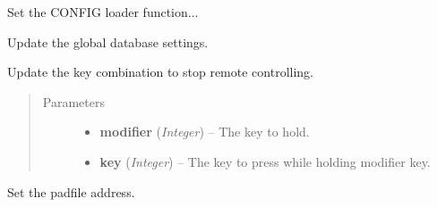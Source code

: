 \documentclass[letterpaper,10pt,english]{sphinxmanual}
\begin{document}

\begin{fulllineitems}
\label{diwavars:diwavars.update_config_loader}
Set the CONFIG loader function...

\end{fulllineitems}


\begin{fulllineitems}
\label{diwavars:diwavars.update_database_vars}
Update the global database settings.

\end{fulllineitems}


\begin{fulllineitems}
\label{diwavars:diwavars.update_keys}
Update the key combination to stop remote controlling.
\begin{quote}\begin{description}
\item[{Parameters}] \leavevmode\begin{itemize}
\item {} 
\textbf{modifier} (\emph{Integer}) -- The key to hold.

\item {} 
\textbf{key} (\emph{Integer}) -- The key to press while holding modifier key.

\end{itemize}

\end{description}\end{quote}

\end{fulllineitems}


\begin{fulllineitems}
\label{diwavars:diwavars.update_padfile}
Set the padfile address.

\end{fulllineitems}
\end{document}
